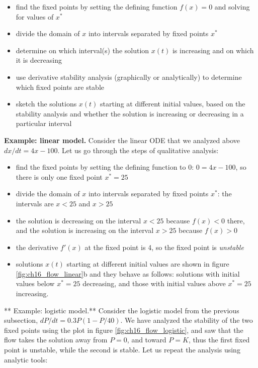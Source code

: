 \documentclass[
  letterpaper,
  DIV=11,
  numbers=noendperiod]{scrreprt}
\begin{document}
\begin{itemize}
\item
  find the fixed points by setting the defining function \(f(x)=0\) and
  solving for values of \(x^*\)
\item
  divide the domain of \(x\) into intervals separated by fixed points
  \(x^*\)
\item
  determine on which interval(s) the solution \(x(t)\) is increasing and
  on which it is decreasing
\item
  use derivative stability analysis (graphically or analytically) to
  determine which fixed points are stable
\item
  sketch the solutions \(x(t)\) starting at different initial values,
  based on the stability analysis and whether the solution is increasing
  or decreasing in a particular interval
\end{itemize}

\textbf{Example: linear model.} Consider the linear ODE that we analyzed
above \(dx/dt = 4x -100\). Let us go through the steps of qualitative
analysis:

\begin{itemize}
\item
  find the fixed points by setting the defining function to 0:
  \(0 = 4x -100\), so there is only one fixed point \(x^* = 25\)
\item
  divide the domain of \(x\) into intervals separated by fixed points
  \(x^*\): the intervals are \(x<25\) and \(x>25\)
\item
  the solution is decreasing on the interval \(x<25\) because \(f(x)<0\)
  there, and the solution is increasing on the interval \(x>25\) because
  \(f(x)>0\)
\item
  the derivative \(f'(x)\) at the fixed point is 4, so the fixed point
  is \emph{unstable}
\item
  solutions \(x(t)\) starting at different initial values are shown in
  figure \ref{fig:ch16_flow_linear}b and they behave as follows:
  solutions with initial values below \(x^*=25\) decreasing, and those
  with initial values above \(x^*=25\) increasing.
\end{itemize}

** Example: logistic model.**
 Consider the logistic
model from the previous subsection, \(dP/dt =0.3P(1-P/40)\). We have
analyzed the stability of the two fixed points using the plot in figure
\ref{fig:ch16_flow_logistic}, and saw that the flow takes the solution
away from \(P=0\), and toward \(P=K\), thus the first fixed point is
unstable, while the second is stable. Let us repeat the analysis using
analytic tools:
\end{document}
